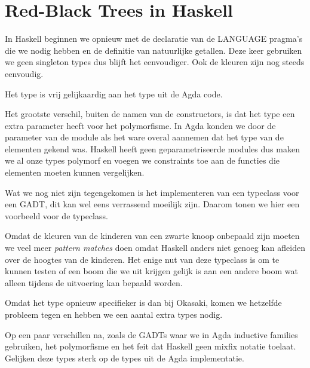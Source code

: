 \section{Red-Black Trees in Haskell}

In Haskell beginnen we opnieuw met de declaratie van de LANGUAGE pragma's die
we nodig hebben en de definitie van natuurlijke getallen. Deze keer gebruiken
we geen singleton types dus blijft het eenvoudiger. Ook de kleuren zijn nog
steeds eenvoudig.


Het  type is vrij gelijkaardig aan het  type uit de
Agda code.


Het grootste verschil, buiten de namen van de constructors, is dat het
 type een extra parameter heeft voor het polymorfisme. In Agda
konden we door de parameter van de module als het ware overal aannemen dat het
type van de elementen gekend was. Haskell heeft geen geparametriseerde modules
dus maken we al onze types polymorf en voegen we constraints toe aan de
functies die elementen moeten kunnen vergelijken.

Wat we nog niet zijn tegengekomen is het implementeren van een typeclass voor
een GADT, dit kan wel eens verrassend moeilijk zijn. Daarom tonen we hier een
voorbeeld voor de  typeclass.


Omdat de kleuren van de kinderen van een zwarte knoop onbepaald zijn moeten we
veel meer \emph{pattern matches} doen omdat Haskell anders niet genoeg kan
afleiden over de hoogtes van de kinderen. Het enige nut van deze typeclass is
om te kunnen testen of een boom die we uit  krijgen gelijk is aan
een andere boom wat alleen tijdens de uitvoering kan bepaald worden.

Omdat het  type opnieuw specifieker is dan bij Okasaki, komen we
hetzelfde probleem tegen en hebben we een aantal extra types nodig.


Op een paar verschillen na, zoals de GADTs waar we in Agda inductive families
gebruiken, het polymorfisme en het feit dat Haskell geen mixfix notatie
toelaat. Gelijken deze types sterk op de types uit de Agda implementatie.

